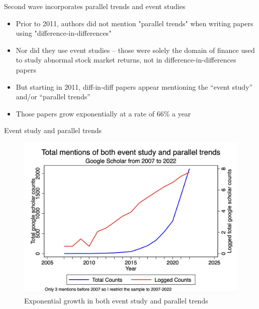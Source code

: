 \documentclass{beamer}
\begin{document}
\begin{frame}{Second wave incorporates parallel trends and event studies}

\begin{itemize}

\item Prior to 2011, authors did not mention "parallel trends" when writing papers using "difference-in-differences"
\item Nor did they use event studies -- those were solely the domain of finance used to study abnormal stock market returns, not in difference-in-differences papers
\item But starting in 2011, diff-in-diff papers appear mentioning the ``event study'' and/or ``parallel trends''
\item Those papers grow exponentially at a rate of 66\% a year
\end{itemize}

\end{frame}

\begin{frame}{Event study and parallel trends}

	\begin{figure}
	\caption{Exponential growth in both event study and parallel trends}
	\includegraphics[scale=0.2]{./lecture_includes/event_pt.png}
	\end{figure}

\end{frame}
\end{document}
